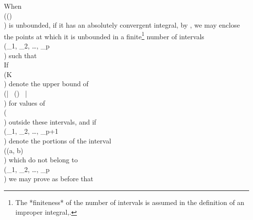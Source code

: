 When \\(\psi(\theta)\\) is unbounded, if it has an absolutely convergent integral,
by , we may enclose the points at which it is unbounded in a
finite\footnote{The *finiteness* of the number of intervals is assumed in the
definition of an improper integral,.} number
%
%
of intervals \\(\delta_{1}, \delta_{2}, \ldots, \delta_{p}\\) such that
\\[ 
\sum_{n=1}^{p}
\int_{\delta_{r}}\!
\left| \,  \psi(\theta)  \, \right|  \, d \theta
<
\eps.
\\] 
If \\(K\\) denote the upper bound of \\(\left| \, \psi(\theta) \, \right| \\) for values of
\\(\theta\\) outside these intervals, and if
\\(\gamma_{1}, \gamma_{2}, \ldots, \gamma_{p+1}\\) denote the portions of the interval
\\((a, b)\\) which do not belong to \\(\delta_{1}, \delta_{2}, \ldots, \delta_{p}\\)
we may prove as before that
\\[ \begin{align*}
  \left| \, \int_{a}^{b}\! \psi(\theta) \sin (\lambda \theta) \, d \theta \, \right| 
  & =
  \left| \, 
    \sum_{r=1}^{p+1}
    \int_{\gamma_{r}}\! \psi(\theta) \sin(\lambda \theta) \, d \theta
    +
    \sum_{r=1}^{p}
    \int_{\delta_{r}}\! \psi(\theta) \sin(\lambda \theta) \, d \theta
   \, \right| 
  \\
  & \leq
  \left| \, 
    \sum_{r=1}^{p+1}
    \int_{\gamma_{r}}\! \psi(\theta) \sin(\lambda \theta) \, d \theta
   \, \right| 
  +
  \sum_{r=1}^{p}
  \int_{\delta_{r}}\!
  \left| \, \psi(\theta) \sin(\lambda \theta) \, \right| 
  \, d \theta
  \\
  & <
  (2nK / \lambda) + 2 \eps.
\end{align*} \\]

